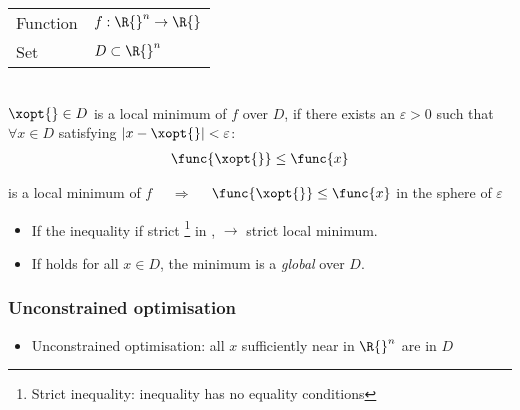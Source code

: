 \begin{tabu} to \textwidth{ll}
Function	& $f: \R{}^n \rightarrow \R{}$\\
Set			& $D \subset \R{}^n$
\end{tabu}~\\

$\xopt{} \in D$ is a local minimum of $f$ over $D$,
if there exists an $\varepsilon > 0$
such that $\forall x \in D$ satisfying
$|x - \xopt{}| < \varepsilon$:
\begin{align}
\func{\xopt{}} \leq \func{x}
\label{eq:local-minimum}
\end{align}

\begin{tcolorbox}
	\xopt{} is a local minimum of $f$
	$\quad \Rightarrow \quad$
	$\func{\xopt{}} \leq \func{x} $ in the sphere of $\varepsilon$
\end{tcolorbox}


\begin{itemize}
\item If the inequality if strict%
	\footnote{Strict inequality: inequality
	has no equality conditions}
 in , $\rightarrow$ strict local minimum.
\item If  holds for all $x \in D$,
		the minimum is a \emph{global} over $D$.
\end{itemize}

\subsubsection{Unconstrained optimisation}
\begin{itemize}
\item Unconstrained optimisation: all $x$ sufficiently
		near \xopt{} in $\R{}^n$ are in $D$
\end{itemize}
